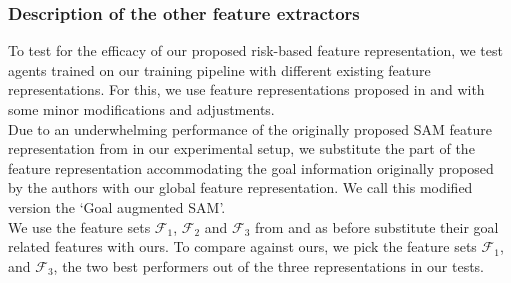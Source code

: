 \subsubsection*{Description of the other feature extractors}
To test for the efficacy of our proposed risk-based feature representation, we test agents trained on our training pipeline with different existing feature representations. For this, we use feature representations proposed in \cite{fahad_learning_2018} and \cite{vasquez_inverse_2014} with some minor modifications and adjustments.\\
Due to an underwhelming performance of the originally proposed SAM feature representation from \cite{fahad_learning_2018} in our experimental setup, we substitute the part of the feature representation accommodating the goal information originally proposed by the authors with our global feature representation. We call this modified version the `Goal augmented SAM'.\\
We use the feature sets $\mathcal{F}_1$, $\mathcal{F}_2$ and $\mathcal{F}_3$ from \cite{vasquez_inverse_2014} and as before substitute their goal related features with ours.
To compare against ours, we pick the feature sets $\mathcal{F}_1$, and $\mathcal{F}_3$, the two best performers out of the three representations in our tests.\\

